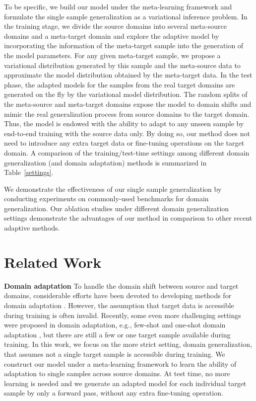 \documentclass{article} \usepackage[table]{xcolor}
\begin{document}
To be specific, we build our model under the meta-learning framework and formulate the single sample generalization as a variational inference problem.
In the training stage, we divide the source domains into several meta-source domains and a meta-target domain and explore the adaptive model by incorporating the information of the meta-target sample into the generation of the model parameters. 
For any given meta-target sample, we propose a variational distribution generated by this sample and the meta-source data to approximate the model distribution obtained by the meta-target data. 
In the test phase, the adapted models for the samples from the real target domains are generated on the fly by the variational model distribution. 
The random splits of the meta-source and meta-target domains expose the model to domain shifts and mimic the real generalization process from source domains to the target domain. 
Thus, the model is endowed with the ability to adapt to any unseen sample by end-to-end training with the source data only.
By doing so, our method does not need to introduce any extra target data or fine-tuning operations on the target domain. 
A comparison of the training/test-time settings among different domain generalization (and domain adaptation) methods is summarized in Table~\ref{settings}.

We demonstrate the effectiveness of our single sample generalization by conducting experiments on commonly-used benchmarks for domain generalization. 
Our ablation studies under different domain generalization settings demonstrate the advantages of our method in comparison to other recent adaptive methods.

\vspace{-2mm}
\section{Related Work}
\vspace{-1mm}

\textbf{Domain adaptation} To handle the domain shift between source and target domains, considerable efforts have been devoted to developing methods for domain adaptation \citep{long2015learning,lu2020stochastic,hoffman2018cycada,kumar2010co,tzeng2017adversarial,luo2019taking}.
However, the assumption that target data is accessible during training is often invalid. 
Recently, some even more challenging settings were proposed in domain adaptation, e.g., few-shot  \citep{motiian2017few} and one-shot domain adaptation \citep{dong2018domain,luo2020adversarial}, but there are still a few or one target sample available during training.
In this work, we focus on the more strict setting, domain generalization, that assumes not a single target sample is accessible during training. We construct our model under a meta-learning framework to learn the ability of adaptation to single samples across source domains. 
At test time, no more learning is needed and we generate an adapted model for each individual target sample by only a forward pass, without any extra fine-tuning operation.
\end{document}
